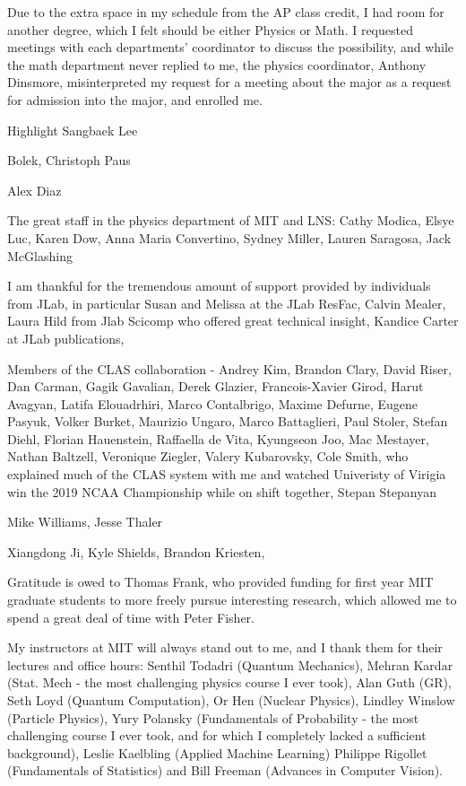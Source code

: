 Due to the extra space in my schedule from the AP class credit, I had room for another degree, which I felt should be either Physics or Math. I requested meetings with each departments' coordinator to discuss the possibility, and while the math department never replied to me, the physics  coordinator, Anthony Dinsmore, misinterpreted my request for a meeting about the major as a request for admission into the major, and enrolled me. 

Highlight Sangbaek Lee

Bolek, Christoph Paus 

Alex Diaz

The great staff in the physics department of MIT and LNS: Cathy Modica, Elsye Luc, Karen Dow, Anna Maria Convertino, Sydney Miller, Lauren Saragosa, Jack McGlashing


I am thankful for the tremendous amount of support provided by individuals from JLab, in particular Susan and Melissa at the JLab ResFac, Calvin Mealer, Laura Hild from Jlab Scicomp who offered great technical insight, Kandice Carter at JLab publications, 

Members of the CLAS collaboration - Andrey Kim, Brandon Clary, David Riser, Dan Carman, Gagik Gavalian, Derek Glazier, Francois-Xavier Girod, Harut Avagyan, Latifa Elouadrhiri, Marco Contalbrigo, Maxime Defurne, Eugene Pasyuk, Volker Burket, Maurizio Ungaro, Marco Battaglieri, Paul Stoler, Stefan Diehl, Florian Hauenstein, Raffaella de Vita, Kyungseon Joo, Mac Mestayer, Nathan Baltzell, Veronique Ziegler, Valery Kubarovsky, Cole Smith, who explained much of the CLAS system with me and watched Univeristy of Virigia win the 2019 NCAA Championship while on shift together, Stepan Stepanyan

Mike Williams, Jesse Thaler


Xiangdong Ji, Kyle Shields, Brandon Kriesten, 

Gratitude is owed to Thomas Frank, who provided funding for first year MIT graduate students to more freely pursue interesting research, which allowed me to spend a great deal of time with Peter Fisher. 

My instructors at MIT will always stand out to me, and I thank them for their lectures and office hours: Senthil Todadri (Quantum Mechanics), Mehran Kardar (Stat. Mech - the most challenging physics course I ever took), Alan Guth (GR), Seth Loyd (Quantum Computation), Or Hen (Nuclear Physics), Lindley Winslow (Particle Physics), Yury Polansky (Fundamentals of Probability - the most challenging course I ever took, and for which I completely lacked a sufficient background), Leslie Kaelbling (Applied Machine Learning) Philippe Rigollet (Fundamentals of Statistics) and Bill Freeman (Advances in Computer Vision). 

